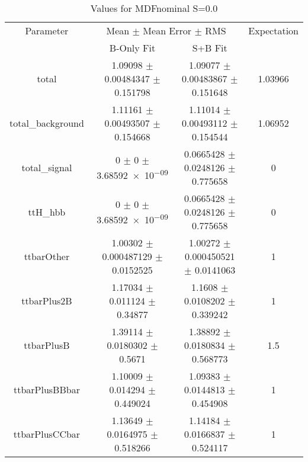 \begin{table}
\centering
\caption{Values for MDFnominal S=0.0}
\begin{tabular}{cccc}
\toprule
Parameter & \multicolumn{2}{c}{Mean $\pm$ Mean Error $\pm$ RMS} & Expectation\\
 & B-Only Fit & S+B Fit & \\
\midrule
total & \num{1.09098} $\pm$ \num{0.00484347} $\pm$ \num{0.151798} & \num{1.09077} $\pm$ \num{0.00483867} $\pm$ \num{0.151648} & \num{1.03966}\\
total\_background & \num{1.11161} $\pm$ \num{0.00493507} $\pm$ \num{0.154668} & \num{1.11014} $\pm$ \num{0.00493112} $\pm$ \num{0.154544} & \num{1.06952}\\
total\_signal & \num{0} $\pm$ \num{0} $\pm$ \num{3.68592e-09} & \num{0.0665428} $\pm$ \num{0.0248126} $\pm$ \num{0.775658} & \num{0}\\
ttH\_hbb & \num{0} $\pm$ \num{0} $\pm$ \num{3.68592e-09} & \num{0.0665428} $\pm$ \num{0.0248126} $\pm$ \num{0.775658} & \num{0}\\
ttbarOther & \num{1.00302} $\pm$ \num{0.000487129} $\pm$ \num{0.0152525} & \num{1.00272} $\pm$ \num{0.000450521} $\pm$ \num{0.0141063} & \num{1}\\
ttbarPlus2B & \num{1.17034} $\pm$ \num{0.011124} $\pm$ \num{0.34877} & \num{1.1608} $\pm$ \num{0.0108202} $\pm$ \num{0.339242} & \num{1}\\
ttbarPlusB & \num{1.39114} $\pm$ \num{0.0180302} $\pm$ \num{0.5671} & \num{1.38892} $\pm$ \num{0.0180834} $\pm$ \num{0.568773} & \num{1.5}\\
ttbarPlusBBbar & \num{1.10009} $\pm$ \num{0.014294} $\pm$ \num{0.449024} & \num{1.09383} $\pm$ \num{0.0144813} $\pm$ \num{0.454908} & \num{1}\\
ttbarPlusCCbar & \num{1.13649} $\pm$ \num{0.0164975} $\pm$ \num{0.518266} & \num{1.14184} $\pm$ \num{0.0166837} $\pm$ \num{0.524117} & \num{1}\\
\bottomrule
\end{tabular}
\end{table}